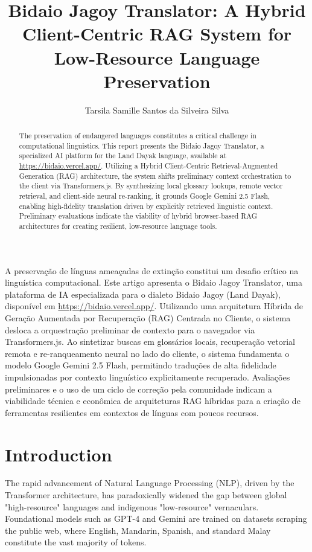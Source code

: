 \documentclass[12pt]{article}
\title{Bidaio Jagoy Translator: A Hybrid Client-Centric RAG System for Low-Resource Language Preservation}
\author{Tarsila Samille Santos da Silveira Silva\inst{1}}
\begin{document}
 

\maketitle

\begin{abstract}
  The preservation of endangered languages constitutes a critical challenge in computational linguistics. This report presents the Bidaio Jagoy Translator, a specialized AI platform for the Land Dayak language, available at \url{https://bidaio.vercel.app/}. Utilizing a Hybrid Client-Centric Retrieval-Augmented Generation (RAG) architecture, the system shifts preliminary context orchestration to the client via Transformers.js. By synthesizing local glossary lookups, remote vector retrieval, and client-side neural re-ranking, it grounds Google Gemini 2.5 Flash, enabling high-fidelity translation driven by explicitly retrieved linguistic context. Preliminary evaluations indicate the viability of hybrid browser-based RAG architectures for creating resilient, low-resource language tools.
\end{abstract}

\begin{resumo}
  A preservação de línguas ameaçadas de extinção constitui um desafio crítico na linguística computacional. Este artigo apresenta o Bidaio Jagoy Translator, uma plataforma de IA especializada para o dialeto Bidaio Jagoy (Land Dayak), disponível em \url{https://bidaio.vercel.app/}. Utilizando uma arquitetura Híbrida de Geração Aumentada por Recuperação (RAG) Centrada no Cliente, o sistema desloca a orquestração preliminar de contexto para o navegador via Transformers.js. Ao sintetizar buscas em glossários locais, recuperação vetorial remota e re-ranqueamento neural no lado do cliente, o sistema fundamenta o modelo Google Gemini 2.5 Flash, permitindo traduções de alta fidelidade impulsionadas por contexto linguístico explicitamente recuperado. Avaliações preliminares e o uso de um ciclo de correção pela comunidade indicam a viabilidade técnica e econômica de arquiteturas RAG híbridas para a criação de ferramentas resilientes em contextos de línguas com poucos recursos.
\end{resumo}

\section{Introduction}

The rapid advancement of Natural Language Processing (NLP), driven by the Transformer architecture, has paradoxically widened the gap between global "high-resource" languages and indigenous "low-resource" vernaculars. Foundational models such as GPT-4 and Gemini are trained on datasets scraping the public web, where English, Mandarin, Spanish, and standard Malay constitute the vast majority of tokens.
\end{document}
